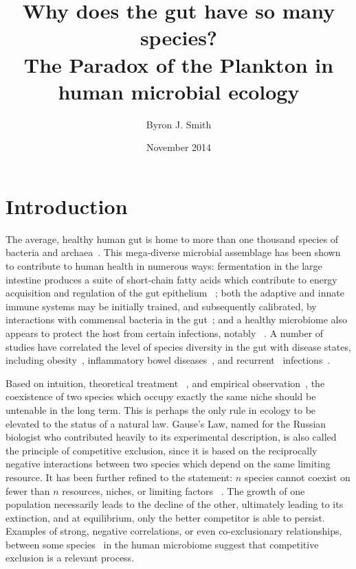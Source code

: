 \documentclass[12pt]{article}
\begin{document}
\title{\huge Why does the gut have so many species? \\
       {\Large The Paradox of the Plankton in human microbial ecology}}
\author{Byron J. Smith}
\date{November 2014}
\maketitle

\section{Introduction}
The average, healthy human gut is home to more than one thousand species of
bacteria and archaea~\citep{Claesson2009,Brestoff2013}.
This mega-diverse microbial assemblage has been shown to contribute to human
health in numerous ways:
fermentation in the large intestine produces a suite of short-chain fatty acids
which contribute to energy acquisition and regulation of the gut epithelium~%
\citep{Macfarlane2012};
both the adaptive and innate immune systems may be initially trained,
and subsequently calibrated,
by interactions with commensal bacteria in the gut~\citep{Brestoff2013};
and a healthy microbiome also appears to protect the host from certain
infections, notably \cdiff~\citep{Britton2012}.
A number of studies have correlated the level of species diversity in the gut
with disease states,
including obesity~\citep{Turnbaugh2008,LeChatelier2013},
inflammatory bowel diseases~\citep{Dicksved2008,Manichanh2006},
and recurrent \cdiff\ infections~\citep{Chang2008}.

Based on intuition, theoretical treatment%
~\citep{Lotka1925,Volterra1928,MacArthur1967a},
and empirical observation~\citep{Gause1932,Gause1936},
the coexistence of two species which occupy
exactly the same niche should be untenable in the long term.
This is perhaps the only rule in ecology to be elevated to the
status of a natural law.
Gause's Law, named for the Russian biologist who contributed
heavily to its experimental description, is also called
the principle of competitive exclusion, since it is based on
the reciprocally negative interactions between two species which
depend on the same limiting resource.
It has been further refined to the statement: \(n\) species cannot coexist on
fewer than \(n\) resources, niches, or limiting factors%
~\citep[various authors, for a review see][]{Armstrong1980}.
The growth of one population necessarily leads to the decline of
the other, ultimately leading to its extinction,
and at equilibrium, only the better competitor is able to persist.
Examples of strong, negative correlations,
or even co-exclusionary relationships,
between some species~\citep{Faust2012a} in the human microbiome
suggest that competitive exclusion is a relevant process.
\end{document}
